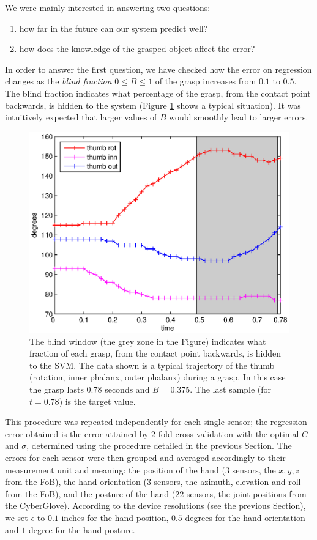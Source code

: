 We were mainly interested in answering two questions:

\begin{enumerate}

  \item how far in the future can our system predict well?

  \item how does the knowledge of the grasped object affect the error?

\end{enumerate}

In order to answer the first question, we have checked how the error
on regression changes as the \emph{blind fraction} $0 \leq B \leq 1$
of the grasp increases from $0.1$ to $0.5$. The blind fraction
indicates what percentage of the grasp, from the contact point
backwards, is hidden to the system (Figure \ref{fig:B_example} shows a
typical situation). It was intuitively expected that larger values of
$B$ would smoothly lead to larger errors.

\begin{figure}[htbp]
  \begin{center}
    \includegraphics[width=0.5\linewidth]{B_example.eps}
    \caption{The blind window (the grey zone in the Figure) indicates
    what fraction of each grasp, from the contact point backwards, is
    hidden to the SVM. The data shown is a typical trajectory of the
    thumb (rotation, inner phalanx, outer phalanx) during a grasp. In
    this case the grasp lasts $0.78$ seconds and $B=0.375$. The last
    sample (for $t=0.78$) is the target value.}
    \label{fig:B_example}
  \end{center}
\end{figure}

This procedure was repeated independently for each single sensor; the
regression error obtained is the error attained by $2$-fold cross
validation with the optimal $C$ and $\sigma$, determined using the
procedure detailed in the previous Section. The errors for each sensor
were then grouped and averaged accordingly to their measurement unit
and meaning: the position of the hand ($3$ sensors, the $x,y,z$ from
the FoB), the hand orientation ($3$ sensors, the azimuth, elevation
and roll from the FoB), and the posture of the hand ($22$ sensors, the
joint positions from the CyberGlove). According to the device
resolutions (see the previous Section), we set $\epsilon$ to $0.1$
inches for the hand position, $0.5$ degrees for the hand orientation
and $1$ degree for the hand posture.

